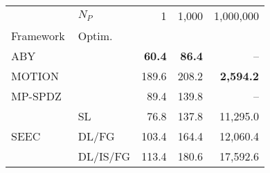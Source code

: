 \begin{tabular}{llrrr}
\toprule
 & $N_P$ & 1 & 1,000 & 1,000,000 \\
Framework & Optim. &  &  &  \\
\midrule
ABY~\cite{DSZ15} &  & \bfseries 60.4 & \bfseries 86.4 & -- \\
\cline{1-5}
MOTION~\cite{BDST22} &  & 189.6 & 208.2 & \bfseries 2,594.2 \\
\cline{1-5}
MP-SPDZ~\cite{CCS:Keller20} &  & 89.4 & 139.8 & -- \\
\cline{1-5}
\multirow[c]{3}{*}{SEEC} & SL & 76.8 & 137.8 & 11,295.0 \\
 & DL/FG & 103.4 & 164.4 & 12,060.4 \\
 & DL/IS/FG & 113.4 & 180.6 & 17,592.6 \\
\bottomrule
\end{tabular}
